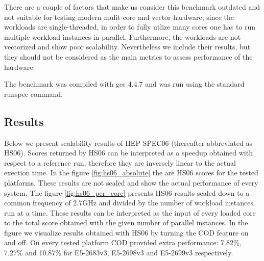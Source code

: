 \documentclass[a4paper]{jpconf}
\begin{document}
There are a couple of factors that make us consider this benchmark outdated and not suitable for testing modern mulit-core and vector hardware; since the workloads are single-threaded, in order to fully utlize many cores one has to run multiple workload instances in parallel. Furthermore, the workloads are not vectorized and show poor scalability. Nevertheless we include their results, but they should not be considered as the main metrics to assess performance of the hardware.

The benchmark was compiled with gcc 4.4.7 and was run using the standard runspec command.
\subsection{Results}
Below we present scalability results of HEP-SPEC06 (thereafter abbreviated as HS06). Scores returned by HS06 can be interpreted as a speedup obtained with respect to a reference run, therefore they are inversely linear to the actual exection time.
In the figure \ref{fig:hs06_absolute} the are HS06 scores for the tested platforms. These results are not scaled and show the actual performance of every system.
The figure \ref{fig:hs06_per_core} presents HS06 results scaled down to a common frequency of 2.7GHz and divided by the number of workload instances run at a time. These results can be interpreted as the input of every loaded core to the total score obtained with the given number of parallel instances.
In the figure we visualize results obtained with HS06 by turning the COD feature on and off. On every tested platform COD provided extra performance: 7.82\%, 7.27\% and 10.87\% for E5-2683v3, E5-2698v3 and E5-2699v3 respectively.
\end{document}
